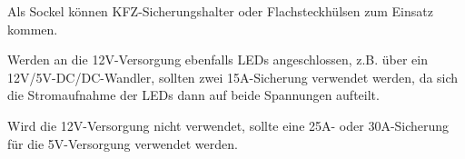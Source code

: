 Als Sockel k\"onnen KFZ-Sicherungshalter oder Flachsteckh\"ulsen zum Einsatz kommen.

Werden an die 12V-Versorgung ebenfalls LEDs angeschlossen,
z.B. \"uber ein 12V/5V-DC/DC-Wandler,
sollten zwei 15A-Sicherung verwendet werden,
da sich die Stromaufnahme der LEDs
dann auf beide Spannungen aufteilt.

Wird die 12V-Versorgung nicht verwendet,
sollte eine 25A- oder 30A-Sicherung
f\"ur die 5V-Versorgung verwendet werden.
